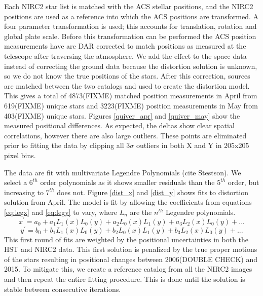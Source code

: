 Each NIRC2 star list is matched with the ACS stellar positions, and the NIRC2 positions are used as a reference into which the ACS positions are transformed.  A four parameter transformation is used; this accounts for translation, rotation and global plate scale.  Before this transformation can be performed the ACS position measurements have are DAR corrected to match positions as measured at the telescope after traversing the atmosphere.  We add the effect to the space data instead of correcting the ground data because the distortion solution is unknown, so we do not know the true positions of the stars.  After this correction, sources are matched between the two catalogs and used to create the distortion model.  This gives a total of 4873(FIXME) matched position measurements in April from 619(FIXME) unique stars  and 3223(FIXME) position measurements in May from 403(FIXME) unique stars.  Figures \ref{quiver_apr} and \ref{quiver_may} show the measured positional differences.  As expected, the deltas show clear spatial correlations, however there are also large outliers.  These points are eliminated prior to fitting the data by clipping all 3$\sigma$ outliers in both X and Y in 205x205 pixel bins.  


The data are fit with multivariate Legendre Polynomials (cite Stestson).  We select a $6^{th}$ order polynomials as it shows smaller residuals than the $5^{th}$ order, but increasing to $7^{th}$ does not.  Figure \ref{dist_x} and \ref{dist_y} shows fits to distortion solution from April.  The model is fit by allowing the coefficients from equations \ref{eq:legx} and \ref{eq:legy} to vary, where $L_{n}$ are the $n^{th}$ Legendre polynomials.  
\begin{equation}
x^{'} = a_{0} + a_{1}L_{1}(x)L_{0}(y) +  a_{2}L_{0}(x)L_{1}(y) + a_{3}L_{2}(x)L_{0}(y)+...
\label{eq:legx}
\end{equation}
\begin{equation}
y^{'} = b_{0} + b_{1}L_{1}(x)L_{0}(y) +  b_{2}L_{0}(x)L_{1}(y) + b_{3}L_{2}(x)L_{0}(y)+...
\label{eq:legy}
\end{equation}
This first round of fits are weighted by the positional uncertainties in both the HST and NIRC2 data.  This first solution is penalized by the true proper motions of the stars resulting in positional changes between 2006(DOUBLE CHECK) and 2015.  To mitigate this, we create a reference catalog from all the NIRC2 images and then repeat the entire fitting procedure.  This is done until the solution is stable between consecutive iterations.  



